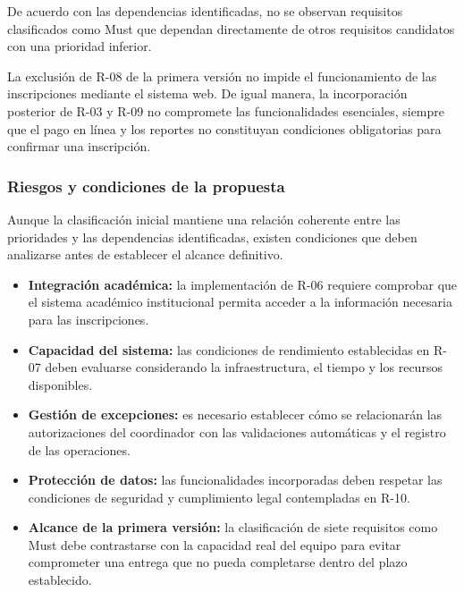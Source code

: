 \documentclass[12pt,a4paper]{article}
\begin{document}
\endgroup

De acuerdo con las dependencias identificadas, no se
observan requisitos clasificados como Must que dependan
directamente de otros requisitos candidatos con una
prioridad inferior.

La exclusión de R-08 de la primera versión no impide
el funcionamiento de las inscripciones mediante el
sistema web. De igual manera, la incorporación
posterior de R-03 y R-09 no compromete las funcionalidades
esenciales, siempre que el pago en línea y los reportes
no constituyan condiciones obligatorias para confirmar
una inscripción.

\subsubsection{Riesgos y condiciones de la propuesta}

Aunque la clasificación inicial mantiene una relación
coherente entre las prioridades y las dependencias
identificadas, existen condiciones que deben analizarse
antes de establecer el alcance definitivo.

\begin{itemize}[leftmargin=1.5em]

    \item \textbf{Integración académica:} la implementación
    de R-06 requiere comprobar que el sistema académico
    institucional permita acceder a la información
    necesaria para las inscripciones.

    \item \textbf{Capacidad del sistema:} las condiciones
    de rendimiento establecidas en R-07 deben evaluarse
    considerando la infraestructura, el tiempo y los
    recursos disponibles.

    \item \textbf{Gestión de excepciones:} es necesario
    establecer cómo se relacionarán las autorizaciones
    del coordinador con las validaciones automáticas
    y el registro de las operaciones.

    \item \textbf{Protección de datos:} las funcionalidades
    incorporadas deben respetar las condiciones de
    seguridad y cumplimiento legal contempladas en R-10.

    \item \textbf{Alcance de la primera versión:} la
    clasificación de siete requisitos como Must debe
    contrastarse con la capacidad real del equipo para
    evitar comprometer una entrega que no pueda
    completarse dentro del plazo establecido.

\end{itemize}
\end{document}
